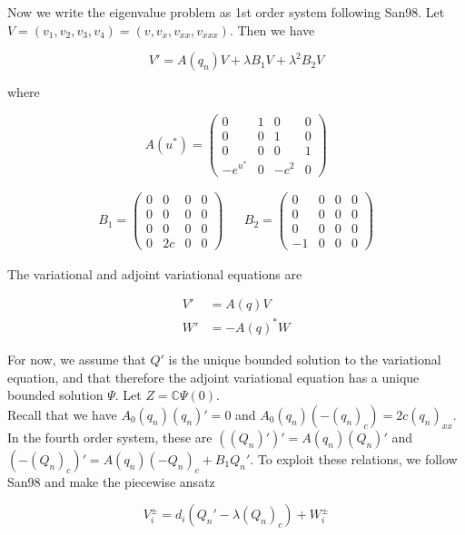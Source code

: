 \documentclass[12pt]{article}
\def\C{{\mathbb C}}
\begin{document}
Now we write the eigenvalue problem as 1st order system following San98. Let $V = (v_1, v_2, v_3, v_4) = (v, v_x, v_{xx}, v_{xxx})$. Then we have

\begin{equation}\label{splitevp}
V' = A(q_n)V + \lambda B_1 V + \lambda^2 B_2 V
\end{equation}

where

\begin{equation}
A(u^*) = \begin{pmatrix}
0 & 1 & 0 & 0 \\
0 & 0 & 1 & 0 \\
0 & 0 & 0 & 1 \\
-e^{u^*} & 0 & -c^2 & 0 
\end{pmatrix}
\end{equation}

\begin{align*}
B_1 = \begin{pmatrix}
0 & 0 & 0 & 0 \\
0 & 0 & 0 & 0 \\
0 & 0 & 0 & 0 \\
0 & 2 c & 0 & 0 
\end{pmatrix} &&
B_2 = \begin{pmatrix}
0 & 0 & 0 & 0 \\
0 & 0 & 0 & 0 \\
0 & 0 & 0 & 0 \\
-1 & 0 & 0 & 0 
\end{pmatrix}
\end{align*}

The variational and adjoint variational equations are

\begin{align}
V' &= A(q)V \\
W' &= -A(q)^* W
\end{align}

For now, we assume that $Q'$ is the unique bounded solution to the variational equation, and that therefore the adjoint variational equation has a unique bounded solution $\Psi$. Let $Z = \C \Psi(0)$.\\

Recall that we have $A_0(q_n)(q_n)' = 0$ and $A_0(q_n)(-(q_n)_c) = 2c (q_n)_{xx}$. In the fourth order system, these are $((Q_n)')' = A(q_n)(Q_n)'$ and $(-(Q_n)_c)' = A(q_n)(-Q_n)_c + B_1 Q_n'$. To exploit these relations, we follow San98 and make the piecewise ansatz

\begin{equation}
V_i^\pm = d_i (Q_n' - \lambda (Q_n)_c) + W_i^\pm
\end{equation}
\end{document}
